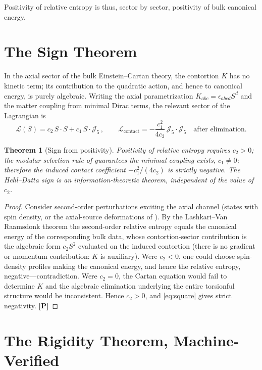 \documentclass[11pt]{article}
\newtheorem{theorem}{Theorem}[section]
\theoremstyle{definition}
\newcommand{\pP}{\textbf{[P]}}
\begin{document}
Positivity of relative entropy is thus, sector by sector, positivity of
bulk canonical energy.

\section{The Sign Theorem}

In the axial sector of the bulk Einstein--Cartan theory, the contortion
$K$ has no kinetic term; its contribution to the quadratic action, and
hence to canonical energy, is purely algebraic. Writing the axial
parametrization $K_{abc}=\epsilon_{abcd}S^d$ and the matter coupling from
minimal Dirac terms, the relevant sector of the Lagrangian is
\begin{equation}
\mathcal L(S)=c_2\,S\!\cdot\!S+c_1\,S\!\cdot\!\mathcal J_5\,,
\qquad
\mathcal L_{\mathrm{contact}}=-\frac{c_1^2}{4c_2}\,
\mathcal J_5\!\cdot\!\mathcal J_5
\quad\text{after elimination.}
\label{eq:square}
\end{equation}

\begin{theorem}[Sign from positivity]
\label{thm:sign}
Positivity of relative entropy requires $c_2>0$; the modular selection
rule of \cite{McGwier2026b} guarantees the minimal coupling exists,
$c_1\neq0$; therefore the induced contact coefficient $-c_1^2/(4c_2)$ is
strictly negative. The Hehl--Datta sign is an information-theoretic
theorem, independent of the value of $c_2$.
\end{theorem}

\begin{proof}
Consider second-order perturbations exciting the axial channel (states
with spin density, or the axial-source deformations of
\cite{McGwier2026b}). By the Lashkari--Van Raamsdonk theorem the
second-order relative entropy equals the canonical energy of the
corresponding bulk data, whose contortion-sector contribution is the
algebraic form $c_2 S^2$ evaluated on the induced contortion (there is no
gradient or momentum contribution: $K$ is auxiliary). Were $c_2<0$, one
could choose spin-density profiles making the canonical energy, and hence
the relative entropy, negative---contradiction. Were $c_2=0$, the Cartan
equation would fail to determine $K$ and the algebraic elimination
underlying the entire torsionful structure \cite{McGwier2026b} would be
inconsistent. Hence $c_2>0$, and \eqref{eq:square} gives strict
negativity. \pP{}
\end{proof}

\section{The Rigidity Theorem, Machine-Verified}
\end{document}
